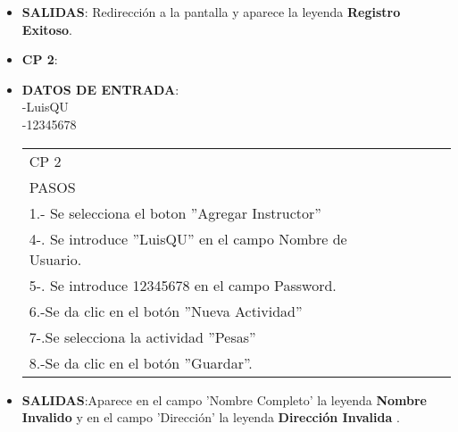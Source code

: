\begin{itemize}
\begin{itemize}
\item \textbf{SALIDAS}: Redirección a la pantalla  y aparece la leyenda \textbf{Registro Exitoso}.
\end{itemize}
\begin{itemize}
\item \textbf{CP 2}:
\item \textbf{DATOS DE ENTRADA}:\\
-LuisQU\\
-12345678\\
	\begin{center}			
	\begin{tabular}{||l|l|l|l||}
		\hline
		\hline
			CP 2\\
			PASOS\\
			\hline 1.- Se selecciona el boton ''Agregar Instructor''\\
			\hline 4-. Se introduce  ''LuisQU'' en el campo Nombre de Usuario.\\
			\hline 5-. Se introduce  12345678  en el campo Password.\\
            \hline 6.-Se da clic en el botón ''Nueva Actividad''\\
            \hline 7-.Se selecciona la actividad ''Pesas''\\
            \hline 8.-Se da clic en el botón ''Guardar''.\\
        \hline
		\hline
	\end{tabular}
	\end{center}
\item \textbf{SALIDAS}:Aparece en el campo 'Nombre Completo' la leyenda \textbf{Nombre Invalido} y en el campo 'Dirección' la leyenda \textbf{Dirección Invalida} .
\end{itemize}
\end{itemize}

